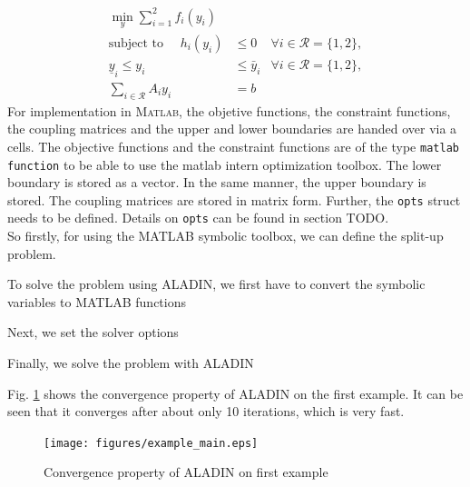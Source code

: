 \documentclass[]{scrartcl}
\begin{document}
\begin{subequations} \label{eq:sepForm_example}
    \begin{align} 
    \min_{y} \sum_{i=1}^2  f_i(y_i)& \\
    \text{subject to }\quad  h_i(y_i)&\leq 0&\forall i \in \mathcal{R} = \{1, 2\}, \label{sepFormInEq_example} \\
    \underline y_i \leq y_i& \leq \bar y_i &\forall i \in \mathcal{R} = \{1, 2\}, \label{sepFormBound_example}\\
    \sum_{i\in \mathcal{R}} A_i y_i&=b \label{eq:consConstr_example}
    \end{align}
\end{subequations}
For implementation in \textsc{Matlab}, the objetive functions, the constraint functions, the coupling matrices and the upper and lower boundaries are handed over via a cells. The objective functions and the constraint functions are of the type \texttt{matlab function} to be able to use the matlab intern optimization toolbox. The lower boundary is stored as a vector. In the same manner, the upper boundary is stored. The coupling matrices are stored in matrix form. Further, the \texttt{opts} struct needs to be defined. Details on \texttt{opts} can be found in section TODO.
\\So firstly, for using the MATLAB symbolic toolbox, we can define the split-up problem.

To solve the problem using ALADIN, we first have to convert the symbolic variables to MATLAB functions

Next, we set the solver options

Finally, we solve the problem with ALADIN

Fig. \ref{fig:example_main} shows the convergence property of ALADIN on the first example. It can be seen that it converges after about only 10 iterations, which is very fast.

\begin{figure}
	\centering
	\texttt{[image: figures/example\_main.eps]}
	\caption{Convergence property of ALADIN on first example}
	\label{fig:example_main}
\end{figure}
\end{document}

